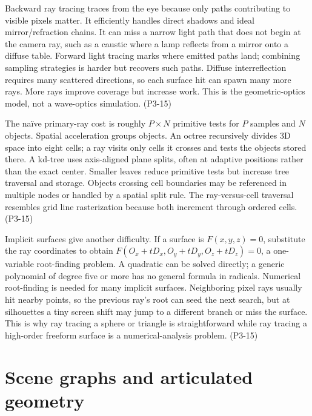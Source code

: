 Backward ray tracing traces from the eye because only paths contributing to visible pixels matter. It efficiently handles direct shadows and ideal mirror/refraction chains. It can miss a narrow light path that does not begin at the camera ray, such as a caustic where a lamp reflects from a mirror onto a diffuse table. Forward light tracing marks where emitted paths land; combining sampling strategies is harder but recovers such paths. Diffuse interreflection requires many scattered directions, so each surface hit can spawn many more rays. More rays improve coverage but increase work. This is the geometric-optics model, not a wave-optics simulation. (P3-15)

The naïve primary-ray cost is roughly \(P\times N\) primitive tests for \(P\) samples and \(N\) objects. Spatial acceleration groups objects. An octree recursively divides 3D space into eight cells; a ray visits only cells it crosses and tests the objects stored there. A kd-tree uses axis-aligned plane splits, often at adaptive positions rather than the exact center. Smaller leaves reduce primitive tests but increase tree traversal and storage. Objects crossing cell boundaries may be referenced in multiple nodes or handled by a spatial split rule. The ray-versus-cell traversal resembles grid line rasterization because both increment through ordered cells. (P3-15)

Implicit surfaces give another difficulty. If a surface is \(F(x,y,z)=0\), substitute the ray coordinates to obtain \(F(O_x+tD_x,O_y+tD_y,O_z+tD_z)=0\), a one-variable root-finding problem. A quadratic can be solved directly; a generic polynomial of degree five or more has no general formula in radicals. Numerical root-finding is needed for many implicit surfaces. Neighboring pixel rays usually hit nearby points, so the previous ray's root can seed the next search, but at silhouettes a tiny screen shift may jump to a different branch or miss the surface. This is why ray tracing a sphere or triangle is straightforward while ray tracing a high-order freeform surface is a numerical-analysis problem. (P3-15)

\section{Scene graphs and articulated geometry}\label{04-visual-computing-ii-ch029-scene-graphs-and-articulated-geometry}

\hypertarget{04-visual-computing-ii-ch029-scene-graphs-and-articulated-geometry}{}

